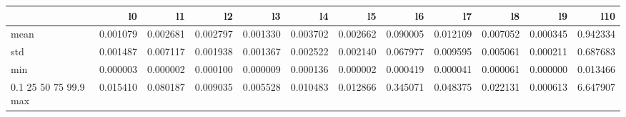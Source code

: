 \begin{tabular}{lrrrrrrrrrrr}
\toprule
 & l0 & l1 & l2 & l3 & l4 & l5 & l6 & l7 & l8 & l9 & l10 \\
\midrule
mean & 0.001079 & 0.002681 & 0.002797 & 0.001330 & 0.003702 & 0.002662 & 0.090005 & 0.012109 & 0.007052 & 0.000345 & 0.942334 \\
std & 0.001487 & 0.007117 & 0.001938 & 0.001367 & 0.002522 & 0.002140 & 0.067977 & 0.009595 & 0.005061 & 0.000211 & 0.687683 \\
min & 0.000003 & 0.000002 & 0.000100 & 0.000009 & 0.000136 & 0.000002 & 0.000419 & 0.000041 & 0.000061 & 0.000000 & 0.013466 \\
0.1%
25%
50%
75%
99.9%
max & 0.015410 & 0.080187 & 0.009035 & 0.005528 & 0.010483 & 0.012866 & 0.345071 & 0.048375 & 0.022131 & 0.000613 & 6.647907 \\
\bottomrule
\end{tabular}
